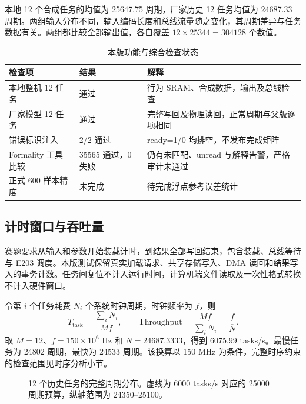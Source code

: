 \documentclass[UTF8,punct,fontset=none,zihao=-4]{ctexart}
\begin{document}
本地 12 个合成任务的均值为 25647.75 周期，厂家历史 12 任务均值为 24687.33 周期。两组输入分布不同，输入编码长度和总线流量随之变化，其周期差异与任务数据有关。两组都比较全部输出值，各自覆盖 $12\times25344=304128$ 个数值。

\begin{table}[H]\centering\small
\caption{本版功能与综合检查状态}
\begin{tabularx}{\linewidth}{p{36mm}p{26mm}Y}\toprule
检查项 & 结果 & 解释\\\midrule
本地整机 12 任务 & 通过 & 行为 SRAM、合成数据，输出及总线检查\\
厂家模型 12 任务 & 通过 & 完整写回及物理读回，正常周期与父版逐项相同\\
错误标识注入 & 2/2 通过 & ready=1/0 均排空，不发布完成矩阵\\
Formality 工具比较 & 35565 通过，0 失败 & 仍有未匹配、unread 与解释告警，严格审计未通过\\
正式 600 样本精度 & 未完成 & 待完成浮点参考误差统计\\
\bottomrule\end{tabularx}
\end{table}



\subsection{计时窗口与吞吐量}
赛题要求从输入和参数开始装载计时，到结果全部写回结束，包含装载、总线等待与 E203 调度。本版测试保留真实加载请求、共享存储写入、DMA 读回和结果写入的事务计数。任务间复位不计入运行时间，计算机端文件读取及一次性格式转换不计入硬件窗口。

令第 $i$ 个任务耗费 $N_i$ 个系统时钟周期，时钟频率为 $f$，则
\[
T_{\mathrm{task}}=\frac{\sum_i N_i}{Mf},\qquad
\mathrm{Throughput}=\frac{Mf}{\sum_iN_i}=\frac{f}{\overline N}.
\]
取 $M=12$、$f=150\times10^6$ Hz 和 $\overline N=24687.3333$，得到 6075.99 tasks/s。最慢任务为 24802 周期，最快为 24533 周期。该换算以 150 MHz 为条件，完整时序约束的检查范围见时序分析小节。

\begin{figure}[H]\centering
{}
\caption{12 个历史任务的完整周期分布。虚线为 6000 tasks/s 对应的 25000 周期预算，纵轴范围为 24350--25100。}
\end{figure}
\end{document}
